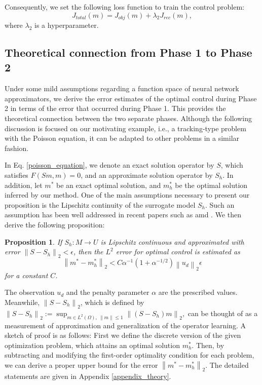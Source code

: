 \documentclass[letterpaper]{article}
\newcommand{\norm}[1]{\left\lVert#1\right\rVert}
\newcommand{\bmm}{m^*}
\newcommand{\bmmh}{m_h^*}
\newtheorem{prop}{Proposition}
\begin{document}
Consequently, we set the following loss function to train the control problem:
\begin{equation}
  J_{total}(m)=J_{obj}(m)+\lambda_2 J_{rec}(m),
\end{equation}
where $\lambda_2$ is a hyperparameter.

\subsection*{Theoretical connection from Phase 1 to Phase 2} \label{section3_3}
Under some mild assumptions regarding a function space of neural network approximators, we derive the error estimates of the optimal control during Phase 2 in terms of the error that occurred during Phase 1. This provides the theoretical connection between the two separate phases. Although the following discussion is focused on our motivating example, i.e., a tracking-type problem with the Poisson equation, it can be adapted to other problems in a similar fashion.

In Eq. \eqref{poisson_equation}, we denote an exact solution operator by $S$, which satisfies $F(Sm, m) = 0$, and an approximate solution operator by $S_h$. In addition, let $\bmm$ be an exact optimal solution, and $\bmmh$ be the optimal solution inferred by our method. One of the main assumptions necessary to present our proposition is the Lipschitz continuity of the surrogate model $S_h$. Such an assumption has been well addressed in recent papers such as \cite{fazlyab2019efficient} amd \cite{NEURIPS2018_d54e99a6}. We then derive the following proposition:
\begin{prop}
  If $S_h: M \rightarrow U$ is Lipschitz continuous and approximated with error $\norm{S - S_h}_2 < \epsilon$, then the $L^2$ error for optimal control is estimated as
  $$
    \norm{\bmm - \bmmh}_2 < C \alpha^{-1} (1 + \alpha^{-1/2}) \norm{u_d}_2 \epsilon
  $$
  for a constant $C$.
\end{prop}
The observation $u_d$ and the penalty parameter $\alpha$ are the prescribed values.
Meanwhile, $\norm{S - S_h}_2$, which is defined by
$
    \norm{S - S_h}_2 := \sup_{m\in L^2(\Omega),\ \norm{m} \leq 1} \norm{(S-S_h) m}_2,
$
can be thought of as a measurement of approximation and generalization of the operator learning. A sketch of proof is as follows: First we define the discrete version of the given optimization problem, which attains an optimal solution $m_h^*$. Then, by subtracting and modifying the first-order optimality condition for each problem, we can derive a proper
upper bound for the error $\norm{\bmm - \bmmh}_2$. The detailed statements are given in Appendix \ref{appendix_theory}.
\end{document}
